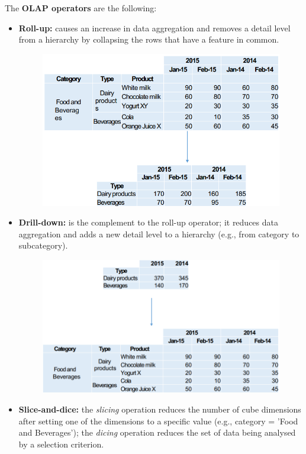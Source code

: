 The \textbf{OLAP operators} are the following:
\begin{itemize}
    \item \textbf{Roll-up:} causes an increase in data aggregation and removes a detail level from a hierarchy by collapsing the rows that have a feature in common.
    \begin{figure}[ht!]
        \centering
        \includegraphics[scale=0.55]{images/OLAP_roll_up.png}
    \end{figure}
    \item \textbf{Drill-down:} is the complement to the roll-up operator; it reduces data aggregation and adds a new detail level to a hierarchy (e.g., from category to subcategory).
    \begin{figure}[ht!]
        \centering
        \includegraphics[scale=0.55]{images/OLAP_drill_down.png}
    \end{figure}
    \item \textbf{Slice-and-dice:} the \textit{slicing} operation reduces the number of cube dimensions after setting one of the dimensions to a specific value (e.g., category = 'Food and Beverages'); the \textit{dicing} operation reduces the set of data being analysed by a selection criterion.

\end{itemize}
